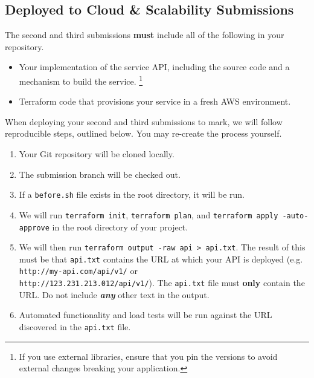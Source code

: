 \documentclass{csse4400}
\begin{document}
\begin{samepage}
\subsection{Deployed to Cloud \& Scalability Submissions}
The second and third submissions \textbf{must} include all of the following in your repository.
\begin{itemize}
  \item Your implementation of the service API, including the source code and a mechanism to build the service.%
        \footnote{If you use external libraries,
                  ensure that you pin the versions to avoid external changes breaking your application.}
  \item Terraform code that provisions your service in a fresh AWS environment.
\end{itemize}
\end{samepage}

\noindent
When deploying your second and third submissions to mark, we will follow reproducible steps, outlined below.
You may re-create the process yourself.

\begin{enumerate}
  \item Your Git repository will be cloned locally.
  \item The submission branch will be checked out.
  \item If a \texttt{before.sh} file exists in the root directory, it will be run.
  \item We will run \texttt{terraform init}, \texttt{terraform plan}, and \texttt{terraform apply -auto-approve}
        in the root directory of your project.
  \item We will then run \texttt{terraform output -raw api > api.txt}.
        The result of this must be that \texttt{api.txt} contains the URL at which your API is deployed
        (e.g. \texttt{http://my-api.com/api/v1/} or \\
        \texttt{http://123.231.213.012/api/v1/}).
        The \texttt{api.txt} file must \textbf{only} contain the URL.
        Do not include \textbf{\textit{any}} other text in the output.
  \item Automated functionality and load tests will be run against the URL discovered in the \texttt{api.txt} file.
\end{enumerate}
\end{document}
